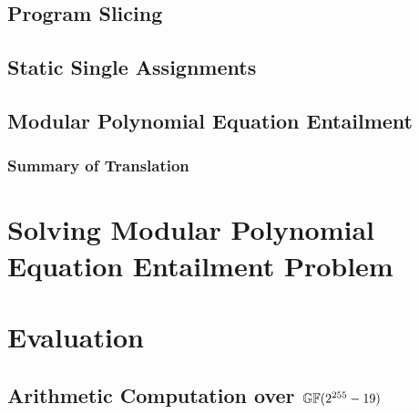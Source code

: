 \documentclass[sigconf,authordraft]{acmart}
\begin{document}
\vspace{-.5em}
\subsection{Program Slicing}
\vspace{-.5em}
\label{subsection:translation:slicing}



\vspace{-.5em}
\subsection{Static Single Assignments}
\vspace{-.5em}
\label{subsection:translation:static-single-assignment}



\vspace{-.5em}
\subsection{Modular Polynomial Equation Entailment}
\vspace{-.5em}
\label{subsection:translation:multivariant-polynomial-equations}


\vspace{-.5em}
\subsubsection*{Summary of Translation}
\vspace{-.5em}



\vspace{-.5em}
\section{Solving Modular Polynomial Equation Entailment Problem}
\vspace{-.5em}
\label{section:solving-algebraic-equations}


\vspace{-.5em}
\section{Evaluation}
\vspace{-.5em}
\label{section:evaluation}


\vspace{-.5em}
\subsection{Arithmetic Computation over $\mathbb{GF}(2^{255}-19)$}
\vspace{-.5em}
\label{subection:evaluation:multiplication}

\end{document}
